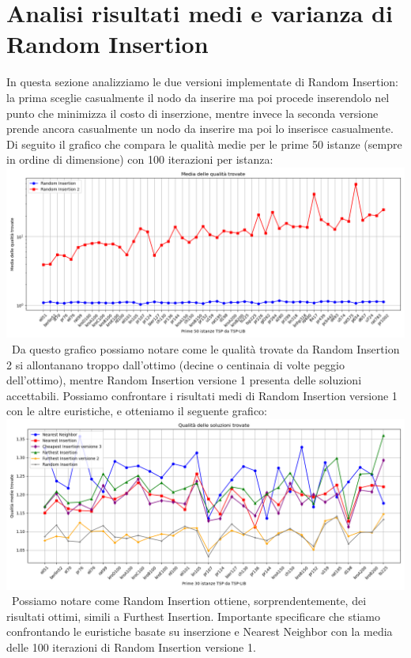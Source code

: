 \documentclass[a4paper,12pt]{report}
\begin{document}
\section{Analisi risultati medi e varianza di Random Insertion}
In questa sezione analizziamo le due versioni implementate di Random Insertion: la prima sceglie casualmente il nodo da inserire ma poi procede inserendolo nel punto che minimizza il costo di inserzione, mentre invece la seconda versione prende ancora casualmente un nodo da inserire ma poi lo inserisce casualmente. Di seguito il grafico che compara le qualità medie per le prime 50 istanze (sempre in ordine di dimensione) con 100 iterazioni per istanza: \newline
\includegraphics[width=1\textwidth]{../Grafici/13.png} \
Da questo grafico possiamo notare come le qualità trovate da Random Insertion 2 si allontanano troppo dall'ottimo (decine o centinaia di volte peggio dell'ottimo), mentre Random Insertion versione 1 presenta delle soluzioni accettabili. Possiamo confrontare i risultati medi di Random Insertion versione 1 con le altre euristiche, e otteniamo il seguente grafico: \newline
\includegraphics[width=1\textwidth]{../Grafici/14.png} \
Possiamo notare come Random Insertion ottiene, sorprendentemente, dei risultati ottimi, simili a Furthest Insertion. Importante specificare che stiamo confrontando le euristiche basate su inserzione e Nearest Neighbor con la media delle 100 iterazioni di Random Insertion versione 1. \newline
\end{document}

